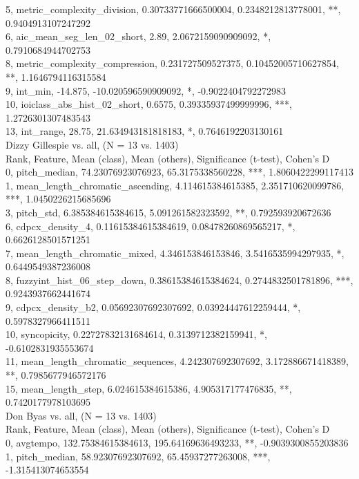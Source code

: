 5, metric_complexity_division, 0.30733771666500004, 0.2348212813778001, **, 0.9404913107247292\\
6, aic_mean_seg_len_02_short, 2.89, 2.0672159090909092, *, 0.7910684944702753\\
8, metric_complexity_compression, 0.231727509527375, 0.10452005710627854, **, 1.1646794116315584\\
9, int_min, -14.875, -10.020596590909092, *, -0.9022404792272983\\
10, ioiclass_abs_hist_02_short, 0.6575, 0.39335937499999996, ***, 1.2726301307483543\\
13, int_range, 28.75, 21.634943181818183, *, 0.7646192203130161\\
Dizzy Gillespie vs. all, (N = 13 vs. 1403)\\
Rank, Feature, Mean (class), Mean (others), Significance (t-test), Cohen's D\\
0, pitch_median, 74.23076923076923, 65.3175338560228, ***, 1.8060422299117413\\
1, mean_length_chromatic_ascending, 4.114615384615385, 2.351710620099786, ***, 1.0450226215685696\\
3, pitch_std, 6.385384615384615, 5.091261582323592, **, 0.792593920672636\\
6, cdpcx_density_4, 0.11615384615384619, 0.08478260869565217, *, 0.6626128501571251\\
7, mean_length_chromatic_mixed, 4.346153846153846, 3.5416535994297935, *, 0.6449549387236008\\
8, fuzzyint_hist_06_step_down, 0.38615384615384624, 0.2744832501781896, ***, 0.9243937662441674\\
9, cdpcx_density_b2, 0.05692307692307692, 0.03924447612259444, *, 0.5978327966411511\\
10, syncopicity, 0.22727832131684614, 0.3139712382159941, *, -0.6102831935553674\\
11, mean_length_chromatic_sequences, 4.242307692307692, 3.172886671418389, **, 0.7985677946572176\\
15, mean_length_step, 6.024615384615386, 4.905317177476835, **, 0.7420177978103695\\
Don Byas vs. all, (N = 13 vs. 1403)\\
Rank, Feature, Mean (class), Mean (others), Significance (t-test), Cohen's D\\
0, avgtempo, 132.75384615384613, 195.64169636493233, **, -0.9039300855203836\\
1, pitch_median, 58.92307692307692, 65.45937277263008, ***, -1.315413074653554\\
